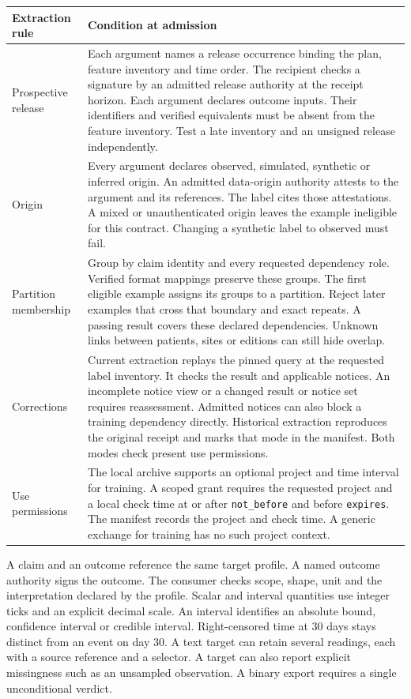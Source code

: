\documentclass[11pt,a4paper]{article}
\newcommand{\topic}[1]{\par\smallskip{\sffamily\bfseries\color{ink}#1\par}\nobreak}
\begin{document}
\small
\begin{tabularx}{\linewidth}{@{}L{.20\linewidth}Y@{}}
\toprule
\textbf{Extraction rule} & \textbf{Condition at admission} \\ \midrule
Prospective release & Each argument names a release occurrence binding the plan, feature inventory and time order. The recipient checks a signature by an admitted release authority at the receipt horizon. Each argument declares outcome inputs. Their identifiers and verified equivalents must be absent from the feature inventory. Test a late inventory and an unsigned release independently. \\
Origin & Every argument declares observed, simulated, synthetic or inferred origin. An admitted data-origin authority attests to the argument and its references. The label cites those attestations. A mixed or unauthenticated origin leaves the example ineligible for this contract. Changing a synthetic label to observed must fail. \\
Partition membership & Group by claim identity and every requested dependency role. Verified format mappings preserve these groups. The first eligible example assigns its groups to a partition. Reject later examples that cross that boundary and exact repeats. A passing result covers these declared dependencies. Unknown links between patients, sites or editions can still hide overlap. \\
Corrections & Current extraction replays the pinned query at the requested label inventory. It checks the result and applicable notices. An incomplete notice view or a changed result or notice set requires reassessment. Admitted notices can also block a training dependency directly. Historical extraction reproduces the original receipt and marks that mode in the manifest. Both modes check present use permissions. \\
Use permissions & The local archive supports an optional project and time interval for training. A scoped grant requires the requested project and a local check time at or after \texttt{not\_before} and before \texttt{expires}. The manifest records the project and check time. A generic exchange for training has no such project context. \\
\bottomrule
\end{tabularx}
\normalsize

\topic{Typed targets}
A claim and an outcome reference the same target profile. A named outcome authority signs the outcome. The consumer checks scope, shape, unit and the interpretation declared by the profile. Scalar and interval quantities use integer ticks and an explicit decimal scale. An interval identifies an absolute bound, confidence interval or credible interval. Right-censored time at 30 days stays distinct from an event on day 30. A text target can retain several readings, each with a source reference and a selector. A target can also report explicit missingness such as an unsampled observation. A binary export requires a single unconditional verdict.
\end{document}
